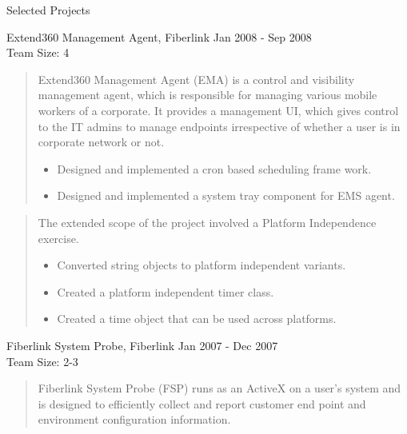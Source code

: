 \documentclass{resume}
\newcommand{\teamsize}{\\\sc\footnotesize Team Size: }
\begin{document}
\begin{category}{Selected Projects}{}

    \item {\topic Extend360 Management Agent,} Fiberlink
        {\period Jan 2008 - Sep 2008}
	{\teamsize 4}
        \begin{quote}
            Extend360 Management Agent (EMA) is a control and visibility
            management agent, which is responsible for managing various mobile
            workers of a corporate. It provides a management UI, which gives
            control to the IT admins to manage endpoints irrespective of
            whether a user is in corporate network or not.

            \begin{itemize}
                \item Designed and implemented a cron based scheduling frame work.
                \item Designed and implemented a system tray component for EMS agent.
            \end{itemize}
        \end{quote}
        \begin{quote}
            The extended scope of the project involved a Platform Independence
            exercise.

            \begin{itemize}
                \item Converted string objects to platform independent
                    variants.
                \item Created a platform independent timer class.
                \item Created a time object that can be used across platforms.
            \end{itemize}
        \end{quote}

    \item {\topic Fiberlink System Probe,} Fiberlink
        {\period Jan 2007 - Dec 2007}
	{\teamsize 2-3}
        \begin{quote}
            Fiberlink System Probe (FSP) runs as an ActiveX on a user’s system
            and is designed to efficiently collect and report customer end
            point and environment configuration information.


\end{quote}
\end{category}
\end{document}
